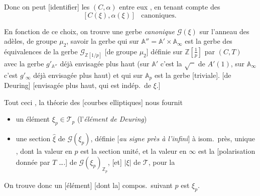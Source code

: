 \documentclass[11pt,a4paper]{article}
\begin{document}
Donc on peut  [identifier] les $(C, \alpha)$
\struck{\ill{}} entre eux \struck{\ill{}}, en tenant compte des
\[
  \bigl[\,C(\xi), \alpha(\xi)\,\bigr] \quad \text{canoniques.}
\]

En fonction de ce choix, on trouve une gerbe \emph{canonique}
$\mathcal{G}(\xi)$ sur l'anneau des adèles, de groupe $\mu_{2}$, savoir la
gerbe qui sur $\mathbb{A}'' = \mathbb{A}' \times \mathbb{A}_{\infty}$ est
la gerbe des équivalences de la gerbe $\mathcal{G}_{\mathbb{Z}[1/p]}$
[de groupe $\mu_{2}$] définie sur $\mathbb{Z}[\tfrac{1}{p}]$ par $(C, T)$
\struck{\ill{}} avec la gerbe $g'_{\mathbb{A}''}$ déjà envisagée plus haut
(sur $\mathbb{A}'$ c'est la $\sqrt{\phantom{x}}$ de $A'(1)$, sur
$\mathbb{A}_{\infty}$ c'est $g'_{\infty}$ déjà envisagée plus haut) et qui
sur $\mathbb{A}_{p}$ est la gerbe  [triviale].
 
[de Deuring] [envisagée plus haut, qui est indép.\ de $\xi$.]

Tout ceci , la théorie des [courbes elliptiques]
 nous fournit
\begin{itemize}
  \item[a)] un élément $\xi_{p} \in \mathcal{T}_{p}$ (l'\emph{élément de
  Deuring})
  \item[b)] une section  $\hat{\xi}$ de
  $\mathcal{G}(\xi_{p})$, définie [\emph{au signe près à l'infini}]
  \struck{\ill{}} à isom.\ près, unique \ill{}, dont la valeur en $p$
  \struck{\ill{}} est la section unité, et la valeur en $\infty$ est la
  [polarisation donnée par $T$ ….] \struck{\ill{}} de
  $\mathcal{G}(\xi_{p})_{\mathbb{Z}_{p}}$, [et] $|\xi|$ de $\mathcal{T}$,
  pour la
\end{itemize}
On trouve donc un [élément]  [dont la] compos.\ suivant $p$
est $\xi_{p}$.
\end{document}
